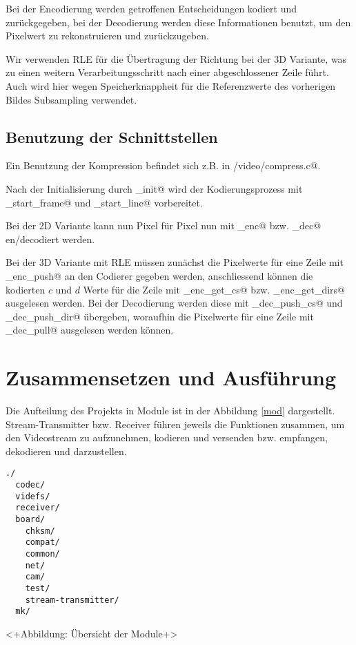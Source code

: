 Bei der Encodierung werden getroffenen Entscheidungen kodiert und zurückgegeben,
bei der Decodierung werden diese Informationen benutzt, um den Pixelwert zu rekonstruieren
und zurückzugeben. 

Wir verwenden RLE für die Übertragung der Richtung bei der 3D Variante,
was zu einen weitern Verarbeitungsschritt nach einer abgeschlossener Zeile führt.
Auch wird hier wegen Speicherknappheit für die Referenzwerte des vorherigen Bildes
Subsampling verwendet.

\subsection{Benutzung der Schnittstellen}
Ein Benutzung der Kompression befindet sich z.B. in \verb@board/video/compress.c@.

Nach der Initialisierung durch \lstinline@cmpr_init@ 
wird der Kodierungsprozess mit \lstinline@cmpr_start_frame@ und
\lstinline@cmpr_start_line@ vorbereitet.

Bei der 2D Variante kann nun Pixel für Pixel nun mit 
\lstinline@cmpr_enc@ bzw. \lstinline@cmpr_dec@ en/decodiert werden.

Bei der 3D Variante mit RLE müssen zunächst die Pixelwerte für eine Zeile mit
_enc_push@ an den Codierer gegeben werden, anschliessend 
können die kodierten $c$ und $d$ Werte für die Zeile 
mit _enc_get_cs@ bzw. _enc_get_dirs@ ausgelesen werden.
Bei der Decodierung werden diese mit _dec_push_cs@ und 
_dec_push_dir@ übergeben, woraufhin die Pixelwerte
für eine Zeile mit _dec_pull@ ausgelesen werden können.



\section{Zusammensetzen und Ausführung}

Die Aufteilung des Projekts in Module ist in der Abbildung \ref{mod} dargestellt.
Stream-Transmitter bzw. Receiver führen jeweils die Funktionen zusammen,
um den Videostream zu aufzunehmen, kodieren und versenden bzw. 
empfangen, dekodieren und darzustellen.

\begin{verbatim}
./
  codec/
  videfs/
  receiver/
  board/
    chksm/
    compat/
    common/
    net/
    cam/
    test/
    stream-transmitter/
  mk/
\end{verbatim}
<+Abbildung: Übersicht der Module+>

